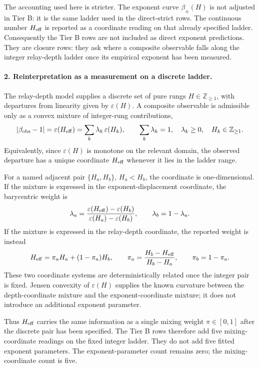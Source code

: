 The accounting used here is stricter. The exponent curve \(\beta_\pm(H)\) is not adjusted in Tier B: it is the same ladder used in the direct-strict rows. The continuous number \(H_{\rm eff}\) is reported as a coordinate reading on that already specified ladder. Consequently the Tier B rows are not included as direct exponent predictions. They are closure rows: they ask where a composite observable falls along the integer relay-depth ladder once its empirical exponent has been measured.

\paragraph{2. Reinterpretation as a measurement on a discrete ladder.}
The relay-depth model supplies a discrete set of pure rungs \(H\in\mathbb{Z}_{\geq 1}\), with departures from linearity given by \(\varepsilon(H)\). A composite observable is admissible only as a convex mixture of integer-rung contributions,
\[
|\beta_{\rm obs}-1|
=
\varepsilon(H_{\rm eff})
=
\sum_k \lambda_k\,\varepsilon(H_k),
\qquad
\sum_k \lambda_k=1,\quad \lambda_k\geq 0,\quad H_k\in\mathbb{Z}_{\geq 1}.
\]
Equivalently, since \(\varepsilon(H)\) is monotone on the relevant domain, the observed departure has a unique coordinate \(H_{\rm eff}\) whenever it lies in the ladder range.

For a named adjacent pair \(\{H_a,H_b\}\), \(H_a<H_b\), the coordinate is one-dimensional. If the mixture is expressed in the exponent-displacement coordinate, the barycentric weight is
\[
\lambda_a
=
\frac{\varepsilon(H_{\rm eff})-\varepsilon(H_b)}
     {\varepsilon(H_a)-\varepsilon(H_b)},
\qquad
\lambda_b=1-\lambda_a .
\]
If the mixture is expressed in the relay-depth coordinate, the reported weight is instead
\[
H_{\rm eff}=\pi_a H_a+(1-\pi_a)H_b,
\qquad
\pi_a=\frac{H_b-H_{\rm eff}}{H_b-H_a},
\qquad
\pi_b=1-\pi_a .
\]
These two coordinate systems are deterministically related once the integer pair is fixed. Jensen convexity of \(\varepsilon(H)\) supplies the known curvature between the depth-coordinate mixture and the exponent-coordinate mixture; it does not introduce an additional exponent parameter.

Thus \(H_{\rm eff}\) carries the same information as a single mixing weight \(\pi\in[0,1]\) after the discrete pair has been specified. The Tier B rows therefore add five mixing-coordinate readings on the fixed integer ladder. They do not add five fitted exponent parameters. The exponent-parameter count remains zero; the mixing-coordinate count is five.

